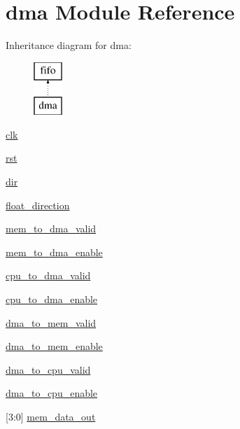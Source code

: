 \hypertarget{enumdma}{}\section{dma Module Reference}
\label{enumdma}
Inheritance diagram for dma\+:\begin{figure}[H]
\begin{center}
\leavevmode
\includegraphics[height=2.000000cm]{d2/d5b/enumdma}
\end{center}
\end{figure}
\begin{DoxyCompactItemize}
\item 
\mbox{\hyperlink{enumdma_a0481abb8206ba22fcd1bad5db283afd1}{clk}}
\item 
\mbox{\hyperlink{enumdma_a18bc13bcbec8196090081641b8de9113}{rst}}
\item 
\mbox{\hyperlink{enumdma_aac28a8c8df33b5bcce79447347957a72}{dir}}
\item 
\mbox{\hyperlink{enumdma_a1378adba2e74daaf6d8f4e2a0a15c512}{float\+\_\+direction}}
\item 
\mbox{\hyperlink{enumdma_a1187ad902d0d07b25c4dfe7fb099a45e}{mem\+\_\+to\+\_\+dma\+\_\+valid}}
\item 
\mbox{\hyperlink{enumdma_a2269f9e84b5c4626b6153a5a37065f90}{mem\+\_\+to\+\_\+dma\+\_\+enable}}
\item 
\mbox{\hyperlink{enumdma_a6fabf91cc2d29bb39c4ec91bce8880ff}{cpu\+\_\+to\+\_\+dma\+\_\+valid}}
\item 
\mbox{\hyperlink{enumdma_a8693a930e7a23b7cff186909af9df454}{cpu\+\_\+to\+\_\+dma\+\_\+enable}}
\item 
\mbox{\hyperlink{enumdma_adebb6c45028d9e8abd6919e9b6dc6492}{dma\+\_\+to\+\_\+mem\+\_\+valid}}
\item 
\mbox{\hyperlink{enumdma_a272e3d64b1ec70497ac14bd358a6e976}{dma\+\_\+to\+\_\+mem\+\_\+enable}}
\item 
\mbox{\hyperlink{enumdma_afe45981e0efd23c51407c4ce3c4ee37e}{dma\+\_\+to\+\_\+cpu\+\_\+valid}}
\item 
\mbox{\hyperlink{enumdma_ac8f125b33d488e6f6113171199a9de9d}{dma\+\_\+to\+\_\+cpu\+\_\+enable}}
\item 
\mbox{[}3\+:0\mbox{]} \mbox{\hyperlink{enumdma_a04109ea4541b06cba36bc5b2d7427d0d}{mem\+\_\+data\+\_\+out}}

\end{DoxyCompactItemize}
